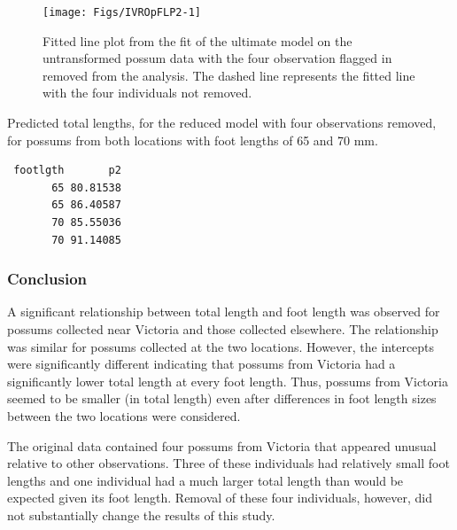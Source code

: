 \documentclass[10pt,openany]{book}\usepackage[]{graphicx}\usepackage[]{color}
\makeatletter
\newenvironment{kframe}{%
 \def\at@end@of@kframe{}%
 \ifinner\ifhmode%
  \def\at@end@of@kframe{\end{minipage}}%
  \begin{minipage}{\columnwidth}%
 \fi\fi%
 \def\FrameCommand##1{\hskip\@totalleftmargin \hskip-\fboxsep
 \colorbox{shadecolor}{##1}\hskip-\fboxsep
     \hskip-\linewidth \hskip-\@totalleftmargin \hskip\columnwidth}%
 \MakeFramed {\advance\hsize-\width
   \@totalleftmargin\z@ \linewidth\hsize
   \@setminipage}}%
 {\par\unskip\endMakeFramed%
 \at@end@of@kframe}
\newenvironment{knitrout}{}{} %
\makeatother
\begin{document}
\begin{knitrout}
\color{fgcolor}\begin{figure}[h]

{\centering \texttt{[image: Figs/IVROpFLP2-1]} 

}

\caption[Fitted line plot from the fit of the ultimate model on the untransformed possum data with the four observation removed from the analysis.]{Fitted line plot from the fit of the ultimate model on the untransformed possum data with the four observation flagged in  removed from the analysis.  The dashed line represents the fitted line with the four individuals not removed.}\label{fig:IVROpFLP2}
\end{figure}


\end{knitrout}

\begin{table}[h]
  \centering
  \caption{Predicted total lengths, for the reduced model with four observations removed, for possums from both locations with foot lengths of 65 and 70 mm.}\label{tab:IVROpPreds2}
\begin{knitrout}
\color{fgcolor}\begin{kframe}
\begin{verbatim}
 footlgth       p2
       65 80.81538
       65 86.40587
       70 85.55036
       70 91.14085
\end{verbatim}
\end{kframe}
\end{knitrout}
\end{table}

\subsubsection*{Conclusion}
A significant relationship between total length and foot length was observed for possums collected near Victoria and those collected elsewhere.  The relationship was similar for possums collected at the two locations.  However, the intercepts were significantly different indicating that possums from Victoria had a significantly lower total length at every foot length.  Thus, possums from Victoria seemed to be smaller (in total length) even after differences in foot length sizes between the two locations were considered.

The original data contained four possums from Victoria that appeared unusual relative to other observations.  Three of these individuals had relatively small foot lengths and one individual had a much larger total length than would be expected given its foot length.  Removal of these four individuals, however, did not substantially change the results of this study.
\end{document}
